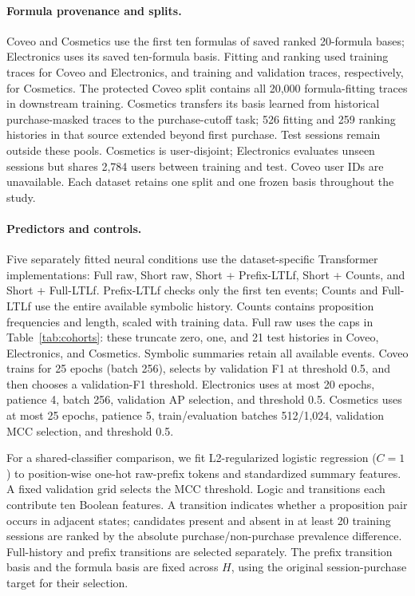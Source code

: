 \documentclass[sigconf,anonymous,nonacm]{acmart}
\newif\ifrevisions
\newenvironment{revblock}{\begingroup\ifrevisions\color{red}\fi}{\endgroup}
\begin{document}
\begin{revblock}
\paragraph{Formula provenance and splits.}
Coveo and Cosmetics use the first ten formulas of saved ranked 20-formula bases; Electronics uses its saved ten-formula basis. Fitting and ranking used training traces for Coveo and Electronics, and training and validation traces, respectively, for Cosmetics. The protected Coveo split contains all 20,000 formula-fitting traces in downstream training. Cosmetics transfers its basis learned from historical purchase-masked traces to the purchase-cutoff task; 526 fitting and 259 ranking histories in that source extended beyond first purchase. Test sessions remain outside these pools. Cosmetics is user-disjoint; Electronics evaluates unseen sessions but shares 2,784 users between training and test. Coveo user IDs are unavailable. Each dataset retains one split and one frozen basis throughout the study.

\paragraph{Predictors and controls.}
Five separately fitted neural conditions use the dataset-specific Transformer implementations: Full raw, Short raw, Short + Prefix-LTLf, Short + Counts, and Short + Full-LTLf. Prefix-LTLf checks only the first ten events; Counts and Full-LTLf use the entire available symbolic history. Counts contains proposition frequencies and length, scaled with training data. Full raw uses the caps in Table~\ref{tab:cohorts}: these truncate zero, one, and 21 test histories in Coveo, Electronics, and Cosmetics. Symbolic summaries retain all available events. Coveo trains for 25 epochs (batch 256), selects by validation F1 at threshold 0.5, and then chooses a validation-F1 threshold. Electronics uses at most 20 epochs, patience 4, batch 256, validation AP selection, and threshold 0.5. Cosmetics uses at most 25 epochs, patience 5, train/evaluation batches 512/1,024, validation MCC selection, and threshold 0.5.

For a shared-classifier comparison, we fit L2-regularized logistic regression ($C=1$) to position-wise one-hot raw-prefix tokens and standardized summary features. A fixed validation grid selects the MCC threshold. Logic and transitions each contribute ten Boolean features. A transition indicates whether a proposition pair occurs in adjacent states; candidates present and absent in at least 20 training sessions are ranked by the absolute purchase/non-purchase prevalence difference. Full-history and prefix transitions are selected separately. The prefix transition basis and the formula basis are fixed across $H$, using the original session-purchase target for their selection.


\end{revblock}
\end{document}
